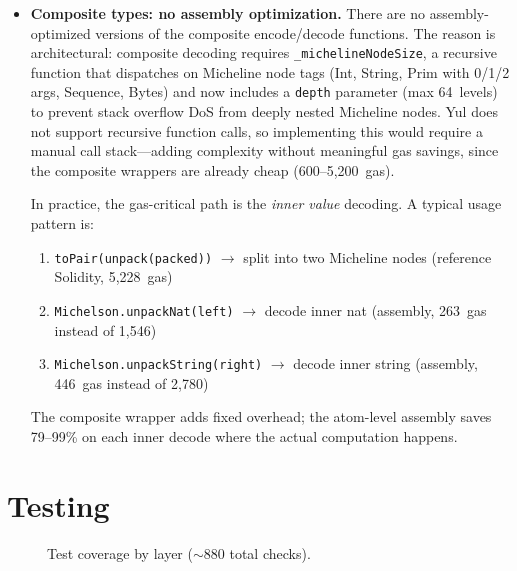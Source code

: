 \documentclass[11pt,a4paper]{article}
\begin{document}
\begin{itemize}
    decoders with an additional bounds check.
  \item \textbf{Composite types: no assembly optimization.} There are no
    assembly-optimized versions of the composite encode/decode functions.
    The reason is architectural: composite decoding requires
    \texttt{\_michelineNodeSize}, a recursive function that dispatches on
    Micheline node tags (Int, String, Prim with 0/1/2 args, Sequence, Bytes)
    and now includes a \texttt{depth} parameter (max 64~levels) to prevent
    stack overflow DoS from deeply nested Micheline nodes.
    Yul does not support recursive function calls, so implementing this
    would require a manual call stack---adding complexity without meaningful
    gas savings, since the composite wrappers are already cheap
    (600--5{,}200~gas).

    In practice, the gas-critical path is the \emph{inner value} decoding.
    A typical usage pattern is:
    \begin{enumerate}[nosep]
      \item \texttt{toPair(unpack(packed))} $\to$ split into two Micheline nodes
        (reference Solidity, 5{,}228~gas)
      \item \texttt{Michelson.unpackNat(left)} $\to$ decode inner nat
        (assembly, 263~gas instead of 1{,}546)
      \item \texttt{Michelson.unpackString(right)} $\to$ decode inner
        string (assembly, 446~gas instead of 2{,}780)
    \end{enumerate}
    The composite wrapper adds fixed overhead; the atom-level assembly saves
    79--99\% on each inner decode where the actual computation happens.
\end{itemize}

\section{Testing}

\begin{figure}[h]
\centering
{}
\caption{Test coverage by layer ($\sim$880 total checks).}
\label{fig:tests}
\end{figure}
\end{document}
